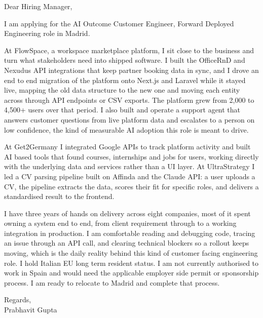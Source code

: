 \documentclass[a4paper,11pt]{article}
\begin{document}
Dear Hiring Manager,

I am applying for the AI Outcome Customer Engineer, Forward Deployed Engineering role in Madrid.

At FlowSpace, a workspace marketplace platform, I sit close to the business and turn what stakeholders need into shipped software. I built the OfficeRnD and Nexudus API integrations that keep partner booking data in sync, and I drove an end to end migration of the platform onto Next.js and Laravel while it stayed live, mapping the old data structure to the new one and moving each entity across through API endpoints or CSV exports. The platform grew from 2,000 to 4,500+ users over that period. I also built and operate a support agent that answers customer questions from live platform data and escalates to a person on low confidence, the kind of measurable AI adoption this role is meant to drive.

At Get2Germany I integrated Google APIs to track platform activity and built AI based tools that found courses, internships and jobs for users, working directly with the underlying data and services rather than a UI layer. At UltraStrategy I led a CV parsing pipeline built on Affinda and the Claude API: a user uploads a CV, the pipeline extracts the data, scores their fit for specific roles, and delivers a standardised result to the frontend.

I have three years of hands on delivery across eight companies, most of it spent owning a system end to end, from client requirement through to a working integration in production. I am comfortable reading and debugging code, tracing an issue through an API call, and clearing technical blockers so a rollout keeps moving, which is the daily reality behind this kind of customer facing engineering role. I hold Italian EU long term resident status. I am not currently authorised to work in Spain and would need the applicable employer side permit or sponsorship process. I am ready to relocate to Madrid and complete that process.

Regards,\\
Prabhavit Gupta
\end{document}
